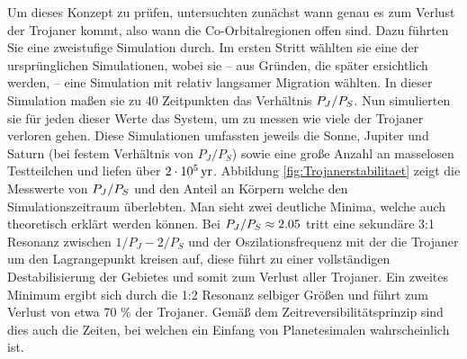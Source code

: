 \documentclass[12pt,a4paper,twoside,open=right,bibliography=totoc]{scrbook}
\renewcommand{\cite}{ \citep}
\begin{document}
Um dieses Konzept zu prüfen, untersuchten \cite{Morbidelli2005} zunächst wann genau es zum Verlust der Trojaner kommt, also wann die Co-Orbitalregionen offen sind.
Dazu führten Sie eine zweistufige Simulation durch. Im ersten Stritt wählten sie eine der ursprünglichen Simulationen, wobei sie – aus Gründen, die später ersichtlich werden, – eine Simulation mit relativ langsamer Migration wählten. %
In dieser Simulation maßen sie zu 40 Zeitpunkten das Verhältnis $P_J/P_S$.
Nun simulierten sie für jeden dieser Werte das System, um zu messen wie viele der Trojaner verloren gehen. Diese Simulationen umfassten jeweils die Sonne, Jupiter und Saturn (bei festem Verhältnis von $P_J/P_S$) sowie eine große Anzahl an masselosen Testteilchen und liefen über $\unit[2\cdot10^5]{yr}$.
Abbildung \ref{fig:Trojanerstabilitaet} zeigt die Messwerte von $P_J/P_S$ und den Anteil an Körpern welche den Simulationszeitraum überlebten. Man sieht zwei deutliche Minima, welche auch theoretisch erklärt werden können.
Bei $P_J/P_S \approx 2.05$ tritt eine sekundäre 3:1 Resonanz zwischen $1/P_J-2/P_S$ und der Oszilationsfrequenz mit der die Trojaner um den Lagrangepunkt kreisen auf, diese führt zu einer vollständigen Destabilisierung der Gebietes und somit zum Verlust aller Trojaner.
Ein zweites Minimum ergibt sich durch die 1:2 Resonanz selbiger Größen und führt zum Verlust von etwa 70 \% der Trojaner.
Gemäß dem Zeitreversibilitätsprinzip sind dies auch die Zeiten, bei welchen ein Einfang von Planetesimalen wahrscheinlich ist.
\end{document}
